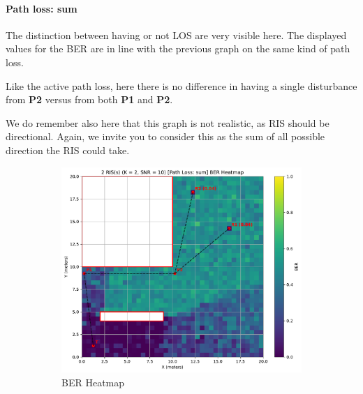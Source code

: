 \paragraph*{Path loss: sum}
The distinction between having or not LOS are very visible here. The displayed values for the BER are in line with the previous graph on the same kind of path loss.

Like the active path loss, here there is no difference in having a single disturbance from \textbf{P2} versus from both \textbf{P1} and \textbf{P2}.

We do remember also here that this graph is not realistic, as RIS should be directional. Again, we invite you to consider this as the sum of all possible direction the RIS could take.

\begin{figure}[H]
  \centering
  \begin{subfigure}[b]{0.48\textwidth}
    \centering
    \includegraphics[width=\textwidth]{imgs/heatmap-simulations/2 RIS(s) (K = 2, SNR = 10) [Path Loss: sum] BER Heatmap.pdf}
    \caption{BER Heatmap}
  \end{subfigure}
  \hfill
  \begin{subfigure}[b]{0.48\textwidth}
    \centering

\end{subfigure}
\end{figure}
